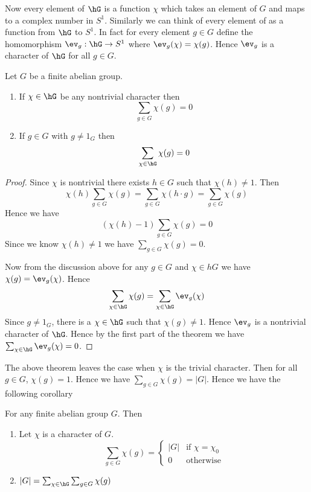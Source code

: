 Now every element of $\hG$ is a function $\chi$ which takes an element of $G$ and maps to a complex number in $S^1$. Similarly we can think of every element of as a function from $\hG$ to $S^1$. In fact for every element $g\in G$ define the homomorphism $\ev_g:\hG\to S^1$ where $\ev_g(\chi)=\chi(g)$. Hence $\ev_g$ is a character of $\hG$ for all $g\in G$.
\begin{Theorem}{}{}
  Let $G$ be a finite abelian group.   \begin{enumerate}[label=(\roman*)]
    \item If $\chi\in \hG$ be any nontrivial character then \begin{equation}
            \sum_{g\in G}\chi(g)=0
          \end{equation}
    \item If $g\in G$ with $g\neq 1_G$ then \begin{equation}
            \sum_{\chi\in \hG}\chi(g)=0
          \end{equation}
  \end{enumerate}
\end{Theorem}
\begin{proof}
  Since $\chi$ is nontrivial there exists $h\in G$ such that $\chi(h)\neq 1$. Then $$\chi(h)\sum_{g\in G}\chi(g)=\sum_{g\in G}\chi(h\cdot g)= \sum_{g\in G}\chi(g)$$Hence we have $$(\chi(h)-1)\sum_{g\in G}\chi(g)=0$$Since we know $\chi(h)\neq 1$ we have $\sum_{g\in G}\chi(g)=0$.

  Now from the discussion above for any $g\in G$ and $\chi\in hG$ we have $\chi(g)=\ev_g(\chi)$. Hence $$\sum_{\chi\in \hG}\chi(g)=\sum_{\chi\in \hG}\ev_g(\chi)$$Since $g\neq 1_G$, there is a $\chi\in\hG$ such that $\chi(g)\neq 1$. Hence $\ev_g$ is a nontrivial character of $\hG$. Hence by the first part of the theorem we have $\sum_{\chi\in \hG}\ev_g(\chi)=0$.
\end{proof}

The above theorem leaves the case when $\chi$ is the trivial character. Then for all $g\in G$, $\chi(g)=1$. Hence we have $\sum_{g\in G}\chi(g)=|G|$. Hence we have the following corollary
\begin{observation}\label{obs:char-sum}
  For any finite abelian group $G$. Then \begin{enumerate}[label=(\roman*)]
    \item Let $\chi$ is a character of $G$. \begin{equation}\label{eq:char-sum}
            \sum_{g\in G}\chi(g)=\begin{cases}
              |G| & \text{if $\chi=\chi_0$} \\
              0   & \text{otherwise}
            \end{cases}
          \end{equation}
    \item $|G|=\sum_{\chi\in \hG}\sum_{g\in G}\chi(g)$
  \end{enumerate}
\end{observation}

